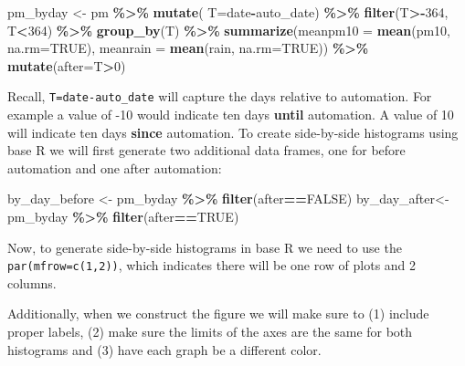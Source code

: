 \documentclass[
]{book}
\newenvironment{Shaded}{\begin{snugshade}}{\end{snugshade}}
\newcommand{\AttributeTok}[1]{\textcolor[rgb]{0.13,0.29,0.53}{#1}}
\newcommand{\ConstantTok}[1]{\textcolor[rgb]{0.56,0.35,0.01}{#1}}
\newcommand{\DecValTok}[1]{\textcolor[rgb]{0.00,0.00,0.81}{#1}}
\newcommand{\FunctionTok}[1]{\textcolor[rgb]{0.13,0.29,0.53}{\textbf{#1}}}
\newcommand{\NormalTok}[1]{#1}
\newcommand{\OtherTok}[1]{\textcolor[rgb]{0.56,0.35,0.01}{#1}}
\newcommand{\SpecialCharTok}[1]{\textcolor[rgb]{0.81,0.36,0.00}{\textbf{#1}}}
\begin{document}
\begin{Shaded}
\begin{Highlighting}[]
\NormalTok{pm\_byday }\OtherTok{\textless{}{-}}\NormalTok{ pm }\SpecialCharTok{\%\textgreater{}\%} 
  \FunctionTok{mutate}\NormalTok{(}
    \AttributeTok{T=}\NormalTok{date}\SpecialCharTok{{-}}\NormalTok{auto\_date) }\SpecialCharTok{\%\textgreater{}\%}
  \FunctionTok{filter}\NormalTok{(T}\SpecialCharTok{\textgreater{}{-}}\DecValTok{364}\NormalTok{, T}\SpecialCharTok{\textless{}}\DecValTok{364}\NormalTok{) }\SpecialCharTok{\%\textgreater{}\%}
  \FunctionTok{group\_by}\NormalTok{(T) }\SpecialCharTok{\%\textgreater{}\%}
  \FunctionTok{summarize}\NormalTok{(}\AttributeTok{meanpm10 =} \FunctionTok{mean}\NormalTok{(pm10, }\AttributeTok{na.rm=}\ConstantTok{TRUE}\NormalTok{),}
    \AttributeTok{meanrain =} \FunctionTok{mean}\NormalTok{(rain, }\AttributeTok{na.rm=}\ConstantTok{TRUE}\NormalTok{)) }\SpecialCharTok{\%\textgreater{}\%}
  \FunctionTok{mutate}\NormalTok{(}\AttributeTok{after=}\NormalTok{T}\SpecialCharTok{\textgreater{}}\DecValTok{0}\NormalTok{)}
\end{Highlighting}
\end{Shaded}

Recall, \texttt{T=date-auto\_date} will capture the days relative to automation. For example a value of -10 would indicate ten days \textbf{until} automation. A value of 10 will indicate ten days \textbf{since} automation. To create side-by-side histograms using base R we will first generate two additional data frames, one for before automation and one after automation:

\begin{Shaded}
\begin{Highlighting}[]
\NormalTok{by\_day\_before }\OtherTok{\textless{}{-}}\NormalTok{ pm\_byday }\SpecialCharTok{\%\textgreater{}\%}
  \FunctionTok{filter}\NormalTok{(after}\SpecialCharTok{==}\ConstantTok{FALSE}\NormalTok{) }
\NormalTok{by\_day\_after}\OtherTok{\textless{}{-}}\NormalTok{ pm\_byday }\SpecialCharTok{\%\textgreater{}\%}
  \FunctionTok{filter}\NormalTok{(after}\SpecialCharTok{==}\ConstantTok{TRUE}\NormalTok{) }
\end{Highlighting}
\end{Shaded}

Now, to generate side-by-side histograms in base R we need to use the \texttt{par(mfrow=c(1,2))}, which indicates there will be one row of plots and 2 columns.

Additionally, when we construct the figure we will make sure to (1) include proper labels, (2) make sure the limits of the axes are the same for both histograms and (3) have each graph be a different color.
\end{document}
